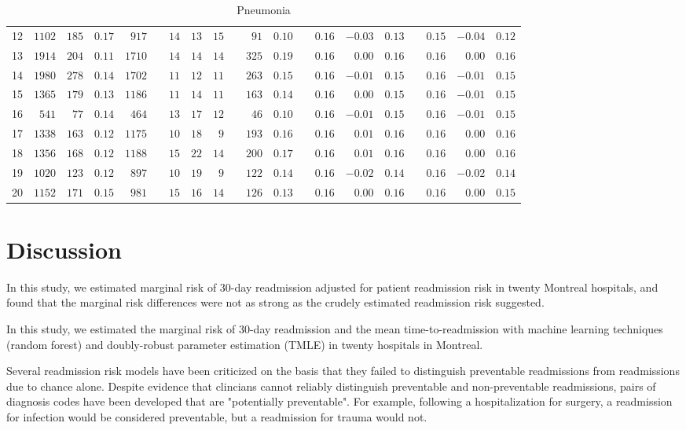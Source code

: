 \documentclass[]{article}\usepackage[]{graphicx}\usepackage[]{color}
\begin{document}
\begin{landscape}
\begin{table}[!tbp]
\begin{center}
\begin{tabular}{lrrrrcrrrcrrcrrrcrrr}
12&$1102$&$185$&$0.17$&$ 917$&&$14$&$13$&$15$&&$ 91$&$0.10$&&$0.16$&$-0.03$&$0.13$&&$0.15$&$-0.04$&$0.12$\tabularnewline
13&$1914$&$204$&$0.11$&$1710$&&$14$&$14$&$14$&&$325$&$0.19$&&$0.16$&$ 0.00$&$0.16$&&$0.16$&$ 0.00$&$0.16$\tabularnewline
14&$1980$&$278$&$0.14$&$1702$&&$11$&$12$&$11$&&$263$&$0.15$&&$0.16$&$-0.01$&$0.15$&&$0.16$&$-0.01$&$0.15$\tabularnewline
15&$1365$&$179$&$0.13$&$1186$&&$11$&$14$&$11$&&$163$&$0.14$&&$0.16$&$ 0.00$&$0.15$&&$0.16$&$-0.01$&$0.15$\tabularnewline
16&$ 541$&$ 77$&$0.14$&$ 464$&&$13$&$17$&$12$&&$ 46$&$0.10$&&$0.16$&$-0.01$&$0.15$&&$0.16$&$-0.01$&$0.15$\tabularnewline
17&$1338$&$163$&$0.12$&$1175$&&$10$&$18$&$ 9$&&$193$&$0.16$&&$0.16$&$ 0.01$&$0.16$&&$0.16$&$ 0.00$&$0.16$\tabularnewline
18&$1356$&$168$&$0.12$&$1188$&&$15$&$22$&$14$&&$200$&$0.17$&&$0.16$&$ 0.01$&$0.16$&&$0.16$&$ 0.00$&$0.16$\tabularnewline
19&$1020$&$123$&$0.12$&$ 897$&&$10$&$19$&$ 9$&&$122$&$0.14$&&$0.16$&$-0.02$&$0.14$&&$0.16$&$-0.02$&$0.14$\tabularnewline
20&$1152$&$171$&$0.15$&$ 981$&&$15$&$16$&$14$&&$126$&$0.13$&&$0.16$&$ 0.00$&$0.16$&&$0.16$&$ 0.00$&$0.15$\tabularnewline
\hline
\end{tabular}

\caption{Pneumonia\label{round}}\end{center}

\end{table}


\setmainfont[Scale=1.25]{Cambria}
\linespread{1.25}


\end{landscape}
\section{Discussion}
In this study, we estimated marginal risk of 30-day readmission adjusted for patient readmission risk in twenty Montreal hospitals, and found that the marginal risk differences were not as strong as the crudely estimated readmission risk suggested. 

In this study, we estimated the marginal risk of 30-day readmission and the mean time-to-readmission with machine learning techniques (random forest) and doubly-robust parameter estimation (TMLE) in twenty hospitals in Montreal.

Several readmission risk models have been criticized on the basis that they failed to distinguish preventable readmissions from readmissions due to chance alone. Despite evidence that clincians cannot reliably distinguish preventable and non-preventable readmissions, pairs of diagnosis codes have been developed that are "potentially preventable". For example, following a hospitalization for surgery, a readmission for infection would be considered preventable, but a readmission for trauma would not.
\end{document}
